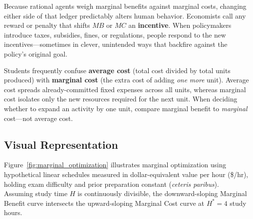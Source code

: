 \documentclass[11pt,letterpaper]{article}
\begin{document}
Because rational agents weigh marginal benefits against marginal costs, changing either side of that ledger predictably alters human behavior. Economists call any reward or penalty that shifts $MB$ or $MC$ an \textbf{incentive}. When policymakers introduce taxes, subsidies, fines, or regulations, people respond to the new incentives—sometimes in clever, unintended ways that backfire against the policy's original goal.

\begin{tcolorbox}[colback=yellow!10!white,colframe=orange!80!black,title=\textbf{Clear It Up: Marginal Cost Is Not Average Cost}]
Students frequently confuse \textbf{average cost} (total cost divided by total units produced) with \textbf{marginal cost} (the extra cost of adding \emph{one more} unit). Average cost spreads already-committed fixed expenses across all units, whereas marginal cost isolates only the new resources required for the next unit. When deciding whether to expand an activity by one unit, compare marginal benefit to \emph{marginal} cost—not average cost.
\end{tcolorbox}

\subsection*{Visual Representation}
Figure~\ref{fig:marginal_optimization} illustrates marginal optimization using hypothetical linear schedules measured in dollar-equivalent value per hour (\$/hr), holding exam difficulty and prior preparation constant (\emph{ceteris paribus}). Assuming study time $H$ is continuously divisible, the downward-sloping Marginal Benefit curve intersects the upward-sloping Marginal Cost curve at $H^* = 4$ study hours.
\end{document}
